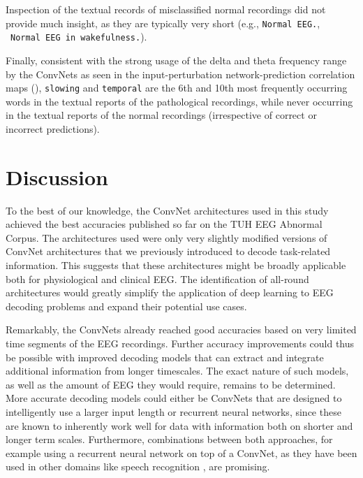 Inspection of the textual records of misclassified normal recordings did
not provide much insight, as they are typically very short (e.g.,
\texttt{Normal\ EEG.}, ~\texttt{Normal\ EEG\ in\ wakefulness.}).

Finally, consistent with the strong usage of the delta and theta
frequency range by the ConvNets as seen in the input-perturbation
network-prediction correlation maps
(),
\texttt{slowing} and \texttt{temporal} are the 6th and 10th most
frequently occurring words in the textual reports of the pathological
recordings, while never occurring in the textual reports of the normal
recordings (irrespective of correct or incorrect predictions).

    \hypertarget{discussion}{%
\section{Discussion}\label{discussion}}

    To the best of our knowledge, the ConvNet architectures used in this
study achieved the best accuracies published so far on the TUH EEG
Abnormal Corpus. The architectures used were only very slightly modified
versions of ConvNet architectures that we previously introduced to
decode task-related information. This suggests that these architectures
might be broadly applicable both for physiological and clinical EEG. The
identification of all-round architectures would greatly simplify the
application of deep learning to EEG decoding problems and expand their
potential use cases.

Remarkably, the ConvNets already reached good accuracies based on very
limited time segments of the EEG recordings. Further accuracy
improvements could thus be possible with improved decoding models that
can extract and integrate additional information from longer timescales.
The exact nature of such models, as well as the amount of EEG they would
require, remains to be determined. More accurate decoding models could
either be ConvNets that are designed to intelligently use a larger input
length or recurrent neural networks, since these are known to inherently
work well for data with information both on shorter and longer term
scales. Furthermore, combinations between both approaches, for example
using a recurrent neural network on top of a ConvNet, as they have been
used in other domains like speech recognition
\cite{li_constructing_2015,sainath_convolutional_2015,sak_fast_2015},
are promising.

